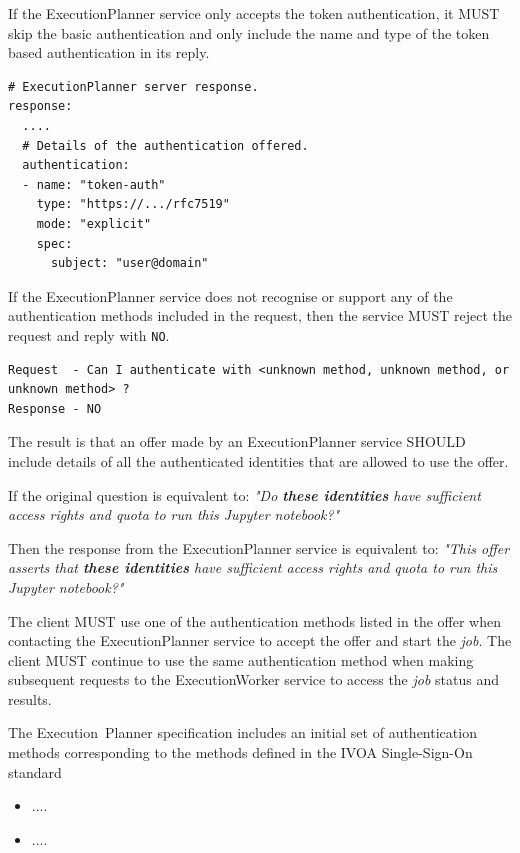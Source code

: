 \documentclass[11pt,a4paper]{ivoa}
\newcommand{\ivoa} {IVOA}
\newcommand{\execplanner} {ExecutionPlanner}
\newcommand{\execworker} {ExecutionWorker}
\newcommand{\executionplanner} {Execution~Planner}
\newcommand{\jupyternotebook} {Jupyter notebook}
\newcommand{\codeword}[1] {\texttt{#1}}
\newcommand{\job} {\textit{job}}
\begin{document}
If the \execplanner{} service only accepts the token authentication, it MUST
skip the basic authentication and only include the name and type of the token
based authentication in its reply.

\begin{lstlisting}[]
# ExecutionPlanner server response.
response:
  ....
  # Details of the authentication offered.
  authentication:
  - name: "token-auth"
    type: "https://.../rfc7519"
    mode: "explicit"
    spec:
      subject: "user@domain"
\end{lstlisting}

If the \execplanner{} service does not recognise or support any of the authentication methods
included in the request, then the service MUST reject the request and reply with \codeword{NO}.

\begin{lstlisting}[]
Request  - Can I authenticate with <unknown method, unknown method, or unknown method> ?
Response - NO
\end{lstlisting}

The result is that an offer made by an \execplanner{} service SHOULD include details
of all the authenticated identities that are allowed to use the offer.

If the original question is equivalent to:
\textit{"Do \textbf{these identities} have sufficient access rights and quota to run this \jupyternotebook{}?"}

Then the response from the \execplanner{} service is equivalent to:
\textit{"This offer asserts that \textbf{these identities} have sufficient access rights and quota to run this \jupyternotebook{}?"}

The client MUST use one of the authentication methods listed in the offer when
contacting the \execplanner{} service to accept the offer and start the \job{}.
The client MUST continue to use the same authentication method when making subsequent
requests to the \execworker{} service to access the \job{} status and results.

The \executionplanner{} specification includes an initial set of authentication methods
corresponding to the methods defined in the
\ivoa{} Single-Sign-On standard\citep{2017ivoa.spec.0524T}

\begin{itemize}
    \item ....
    \item ....
\end{itemize}
\end{document}

